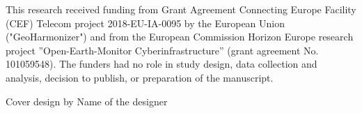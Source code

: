 \vspace*{1cm}
This research received funding from Grant Agreement Connecting Europe Facility (CEF) Telecom project 2018-EU-IA-0095 by the European Union ("GeoHarmonizer") and from the European Commission Horizon Europe research project ”Open-Earth-Monitor Cyberinfrastructure” (grant agreement No. 101059548). The funders had no role in study design, data collection and analysis, decision to publish, or preparation of the manuscript.


\vspace*{\fill}
Cover design by Name of the designer
